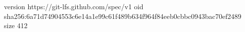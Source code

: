 version https://git-lfs.github.com/spec/v1
oid sha256:6a71d74904553c6e14a1e99c61f489b634f964f84eeb0cbbc0943bac70ef2489
size 412
